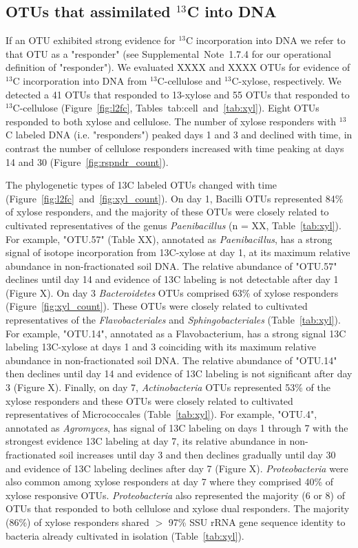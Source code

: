 \subsection{OTUs that assimilated $^{13}$C into DNA} \label{responders}
If an OTU exhibited strong evidence for $^{13}$C incorporation into DNA we
refer to that OTU as a "responder" (see Supplemental Note 1.7.4 for our
operational definition of "responder"). We evaluated XXXX and XXXX OTUs for
evidence of $^{13}$C incorporation into DNA from $^{13}$C-cellulose and
$^{13}$C-xylose, respectively. We detected a 41 OTUs that responded to
13-xylose and 55 OTUs that responded to $^{13}$C-cellulose (Figure~\ref{fig:l2fc}, 
Tables~{tab:cell}~and~\ref{tab:xyl}). Eight OTUs responded to both xylose and cellulose. The number of
xylose responders with $^{13}$C labeled DNA (i.e. "responders") peaked days
1 and 3 and declined with time, in contrast the number of cellulose responders
increased with time peaking at days 14 and 30 (Figure~\ref{fig:rspndr_count}). 

The phylogenetic types of 13C labeled OTUs changed with time (Figure~\ref{fig:l2fc}~and~\ref{fig:xyl_count}).
On day 1, Bacilli OTUs represented 84\% of xylose responders, and the
majority of these OTUs were closely related to cultivated representatives of
the genus \textit{Paenibacillus} (n = XX, Table~\ref{tab:xyl}). For example, "OTU.57"
(Table XX), annotated as \textit{Paenibacillus}, has a strong signal of isotope
incorporation from 13C-xylose at day 1, at its maximum relative abundance in
non-fractionated soil DNA. The relative abundance of "OTU.57" declines until
day 14 and evidence of 13C labeling is not detectable after day 1 (Figure
X). On day 3 \textit{Bacteroidetes} OTUs comprised 63\% of xylose responders
(Figure~\ref{fig:xyl_count}). These OTUs were closely related to cultivated representatives of
the \textit{Flavobacteriales} and \textit{Sphingobacteriales} (Table~\ref{tab:xyl}). For
example, "OTU.14", annotated as a Flavobacterium, has a strong signal 13C
labeling 13C-xylose at days 1 and 3 coinciding with its maximum relative
abundance in non-fractionated soil DNA. The relative abundance of "OTU.14" then
declines until day 14 and evidence of 13C labeling is not significant after day
3 (Figure X). Finally, on day 7, \textit{Actinobacteria} OTUs represented 53\%
of the xylose responders and these OTUs were closely related to cultivated
representatives of Micrococcales (Table~\ref{tab:xyl}). For example, "OTU.4", annotated as
\textit{Agromyces}, has signal of 13C labeling on days 1 through 7 with the
strongest evidence 13C labeling at day 7, its relative abundance in
non-fractionated soil increases until day 3 and then declines gradually until
day 30 and evidence of 13C labeling declines after day 7 (Figure X).
\textit{Proteobacteria} were also common among xylose responders at day 7 where
they comprised 40\% of xylose responsive OTUs. \textit{Proteobacteria} also
represented the majority (6 or 8) of OTUs that responded to both cellulose and
xylose dual responders. The majority (86\%) of xylose responders shared $>$
97\% SSU rRNA gene sequence identity to bacteria already cultivated in
isolation (Table~\ref{tab:xyl}). 

